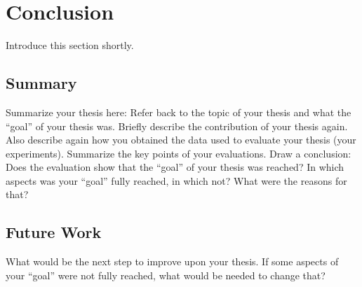 \chapter{Conclusion}
\label{cha:conclusion}
Introduce this section shortly.

\section{Summary}
\label{sec:summary}
Summarize your thesis here:
Refer back to the topic of your thesis and what the ``goal'' of your thesis was.
Briefly describe the contribution of your thesis again.
Also describe again how you obtained the data used to evaluate your thesis (your experiments).
Summarize the key points of your evaluations.
Draw a conclusion: Does the evaluation show that the ``goal'' of your thesis was reached?
In which aspects was your ``goal'' fully reached, in which not?
What were the reasons for that?

\section{Future Work}
\label{sec:future_work}
What would be the next step to improve upon your thesis.
If some aspects of your ``goal'' were not fully reached, what would be needed to change that?
